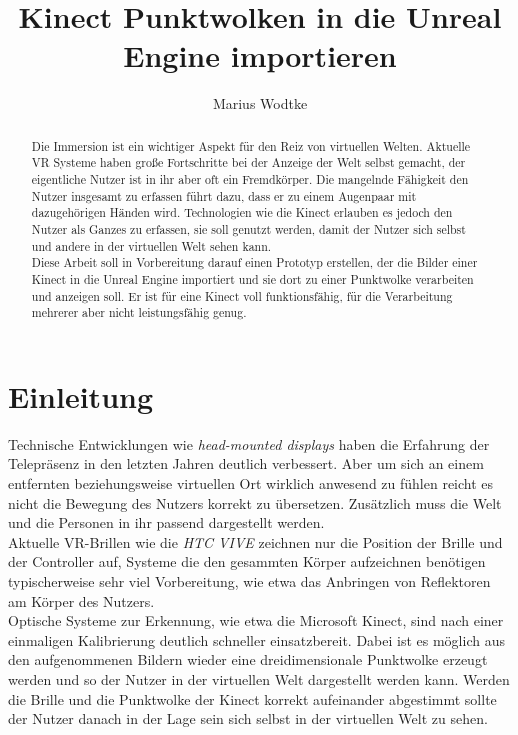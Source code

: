 \documentclass[a4paper]{IEEEtran}
\title{Kinect Punktwolken in die Unreal Engine importieren}
\author{Marius Wodtke}
\begin{document}
\maketitle

\begin{abstract}
	Die Immersion ist ein wichtiger Aspekt für den Reiz von virtuellen Welten. 
	Aktuelle VR Systeme haben große Fortschritte bei der Anzeige der Welt selbst gemacht, der eigentliche Nutzer ist in ihr aber oft ein Fremdkörper.
	Die mangelnde Fähigkeit den Nutzer insgesamt zu erfassen führt dazu, dass er zu einem Augenpaar mit dazugehörigen Händen wird. 
	Technologien wie die Kinect erlauben es jedoch den Nutzer als Ganzes zu erfassen, sie soll genutzt werden, damit der Nutzer sich selbst und andere in der virtuellen Welt sehen kann.\\
	Diese Arbeit soll in Vorbereitung darauf einen Prototyp erstellen, der die Bilder einer Kinect in die Unreal Engine importiert und sie dort zu einer Punktwolke verarbeiten und anzeigen soll.
	Er ist für eine Kinect voll funktionsfähig, für die Verarbeitung mehrerer aber nicht leistungsfähig genug.
\end{abstract}

\section{Einleitung}
	Technische Entwicklungen wie {\textit{head-mounted displays}} haben die Erfahrung der Telepräsenz in den letzten Jahren deutlich verbessert. 
	Aber um sich an einem entfernten beziehungsweise virtuellen Ort wirklich anwesend zu fühlen reicht es nicht die Bewegung des Nutzers korrekt zu übersetzen. 
	Zusätzlich muss die Welt und die Personen in ihr passend dargestellt werden. \\
	Aktuelle VR-Brillen wie die \textit{HTC VIVE} zeichnen nur die Position der Brille und der Controller auf, Systeme die den gesammten Körper aufzeichnen benötigen typischerweise sehr viel Vorbereitung, wie etwa das Anbringen von Reflektoren am Körper des Nutzers. \\
	Optische Systeme zur Erkennung, wie etwa die Microsoft Kinect, sind nach einer einmaligen Kalibrierung deutlich schneller einsatzbereit. 
	Dabei ist es möglich aus den aufgenommenen Bildern wieder eine dreidimensionale Punktwolke erzeugt werden und so der Nutzer in der virtuellen Welt dargestellt werden kann. 
	Werden die Brille und die Punktwolke der Kinect korrekt aufeinander abgestimmt sollte der Nutzer danach in der Lage sein sich selbst in der virtuellen Welt zu sehen.\\
\end{document}
